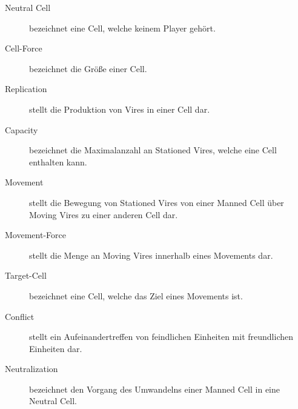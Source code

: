 \begin{description}
	\item[Neutral Cell] bezeichnet eine Cell, welche keinem Player gehört.
	\item[Cell-Force] bezeichnet die Größe einer Cell.
	\item[Replication] stellt die Produktion von Vires in einer Cell dar.
	\item[Capacity] bezeichnet die Maximalanzahl an Stationed Vires, welche eine Cell enthalten kann.
	\item[Movement] stellt die Bewegung von Stationed Vires von einer Manned Cell über Moving Vires zu einer anderen Cell dar. 
	\item[Movement-Force] stellt die Menge an Moving Vires innerhalb eines Movements dar.
	\item[Target-Cell] bezeichnet eine Cell, welche das Ziel eines Movements ist.
	\item[Conflict] stellt ein Aufeinandertreffen von feindlichen Einheiten mit freundlichen Einheiten dar.
	\item[Neutralization] bezeichnet den Vorgang des Umwandelns einer Manned Cell in eine Neutral Cell.
\end{description}